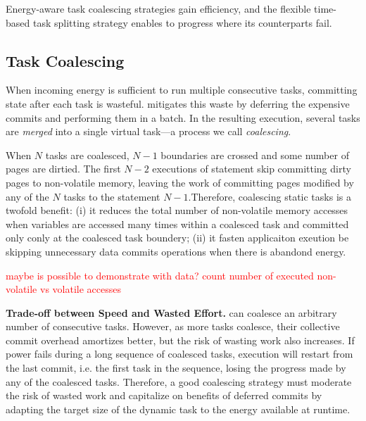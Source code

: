 Energy-aware task coalescing strategies gain \sys efficiency, and the flexible time-based task splitting strategy enables \sys to progress where its counterparts fail.

\subsection{Task Coalescing}
\label{sec:task_coalescing}


\noindent When incoming energy is sufficient to run multiple consecutive tasks,
committing state after each task is wasteful. \sys mitigates this
waste by deferring the expensive commits and performing them in a
batch. In the resulting execution, several tasks are \emph{merged} into a
single virtual task---a process we call \emph{coalescing}. 


\noindent When $N$ tasks are coalesced, $N-1$ boundaries are crossed and some number of
pages are dirtied. The first $N-2$ executions of \transition statement skip
committing dirty pages to non-volatile memory, leaving the work of committing
pages modified by any of the $N$ tasks to the statement $N-1$.Therefore, coalescing static tasks is a twofold benefit: (i) it reduces the total number of non-volatile memory
accesses when variables are accessed many times within a coalesced task and committed only conly at the coalesced task boundery; (ii) it fasten applicaiton exeution be skipping unnecessary data commits operations when there is abandond energy. 

\textcolor{red}{maybe is possible to demonstrate with data? count number of executed non-volatile vs volatile accesses}
%

\noindent \textbf{Trade-off between Speed and Wasted Effort.} \sys can coalesce an
arbitrary number of consecutive tasks. However, as more tasks coalesce, their
collective commit overhead amortizes better, but the risk of wasting work also
increases. If power fails during a long sequence of coalesced tasks, execution
will restart from the last commit, i.e. the first task in the sequence, losing
the progress made by any of the coalesced tasks. Therefore, a good coalescing strategy must moderate the risk of wasted work and capitalize on benefits of deferred commits by adapting the target size of the dynamic task
to the energy available at runtime. 
%

